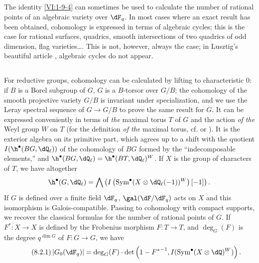 \documentclass[oneside]{book}
\begin{document}
\subsection{}\label{VI:8-1}

The identity \ref{VI:1-9-4} can sometimes be used to calculate 
the number of rational points of an algebraic variety over $\dF_q$. In 
most cases where an exact result has been obtained, cohomology 
is expressed in terms of algebraic cycles; this is the case for rational 
surfaces, quadrics, smooth intersections of two quadrics of 
odd dimension, flag varieties\ldots. This is not, however, 
always the case; in Lusztig's beautiful article \cite{lu76}, algebraic cycles 
do not appear. 





\subsection{}\label{VI:8-2}

For reductive groups, cohomology can be calculated by lifting to 
characteristic $0$: if $B$ is a Borel subgroup of $G$, $G$ is a 
$B$-torsor over $G/B$; the cohomology of the smooth projective variety 
$G/B$ is invariant under specialization, and we use the Leray spectral sequence 
of $G\to G/B$ to prove the same result for $G$. It can be expressed 
conveniently in terms of \emph{the} maximal torus $T$ of $G$ and the action 
\emph{of the} Weyl group $W$ on $T$ (for the definition \emph{of the} maximal 
torus, cf. \cite[VIII \S 2 Rem.2]{bo05} or \cite[p.105]{dl76}). It is 
the exterior algebra on its primitive part, which agrees up to a shift 
with the quotient $I(\h^\bullet(B G,\dQ_\ell))$ of the cohomology of 
$B G$ formed by the ``indecomposable elements,'' and 
$\h^\bullet(B G,\dQ_\ell)=\h^\bullet(B T,\dQ_\ell)^W$. If $X$ is the group of 
characters of $T$, we have altogether 
\[
  \h^\bullet(G,\dQ_\ell) = \bigwedge \left(I\left(\operatorname{Sym}^\bullet(X\otimes \dQ_\ell(-1))^W\right)[-1]\right) \text{.}
\]
If $G$ is defined over a finite field $\dF_q$, $\gal(\dF/\dF_q)$ acts on $X$ 
and this isomorphism is Galois-compatible. Passing to 
cohomology with compact supports, we recover the classical formulas for the 
number of rational points of $G$. If $F^\ast:X\to X$ is defined by the 
Frobenius morphism $F:T\to T$, and $\deg_G(F)$ is the degree 
$q^{\dim G}$ of $F:G\to G$, we have 
\begin{equation*}\tag{8.2.1}\label{VI:eq:8-2-1}
  \left|G_0(\dF_q)\right| = \deg_G(F) \cdot \det\left(1-{F^\ast}^{-1},I(\operatorname{Sym}^\bullet(X\otimes \dQ)^W)\right) \text{.}
\end{equation*}
\end{document}
